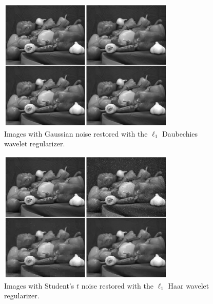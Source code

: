 \documentclass[10pt,a4paper]{article}
\begin{document}
	\begin{figure}[H]
		\begin{center}
			\includegraphics[width = 0.75\textwidth]{../figures/waveletGaussD.pdf} 
		\end{center}
		\caption{Images with Gaussian noise restored with the $\ell_1$ Daubechies wavelet regularizer.}
		\label{waveletD_gauss}
	\end{figure}
	
	\begin{figure}[H]
		\begin{center}
			\includegraphics[width = 0.75\textwidth]{../figures/waveletStudentH.pdf} 
		\end{center}
		\caption{Images with Student's $t$ noise restored with the $\ell_1$ Haar wavelet regularizer.}
		\label{waveletH_student}
	\end{figure}
	
\end{document}
